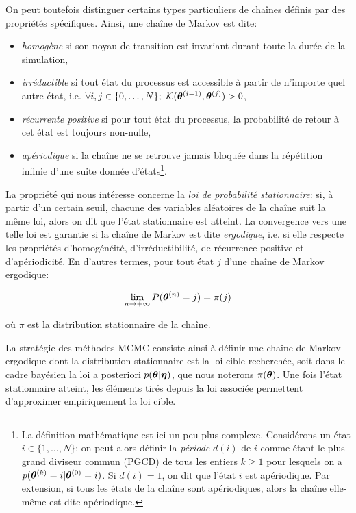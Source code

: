 On peut toutefois distinguer certains types particuliers de chaînes définis par des propriétés spécifiques. Ainsi, une chaîne de Markov est dite:
\begin{itemize}
	\item \textit{homogène} si son noyau de transition est invariant durant toute la durée de la simulation,
	\item \textit{irréductible} si tout état du processus est accessible à partir de n'importe quel autre état, i.e. $\forall i,j \in \{0,\dots,N\}; ~ {\mathcal{K}}({{\bm{\theta}}^{(i-1)}}, {\bm{\theta}}^{(j)}) > 0$,
	\item \textit{récurrente positive} si pour tout état du processus, la probabilité de retour à cet état est toujours non-nulle,
	\item \textit{apériodique} si la chaîne ne se retrouve jamais bloquée dans la répétition infinie d'une suite donnée d'états\footnote{La définition mathématique est ici un peu plus complexe. Considérons un état $i \in \{1, \dots, N\}$: on peut alors définir la \textit{période} $d(i)$ de $i$ comme étant le plus grand diviseur commun (PGCD) de tous les entiers $k \geq 1$ pour lesquels on a $p({\bm{\theta}}^{(k)} = i | {\bm{\theta}}^{(0)} = i)$. Si $d(i) = 1$, on dit que l'état $i$ est apériodique. Par extension, si tous les états de la chaîne sont apériodiques, alors la chaîne elle-même est dite apériodique.}.\\
\end{itemize}

La propriété qui nous intéresse concerne la \textit{loi de probabilité stationnaire}: si, à partir d'un certain seuil, chacune des variables aléatoires de la chaîne suit la même loi, alors on dit que l'état stationnaire est atteint. La convergence vers une telle loi est garantie si la chaîne de Markov est dite \textit{ergodique}, i.e. si elle respecte les propriétés d'homogénéité, d'irréductibilité, de récurrence positive et d'apériodicité. En d'autres termes, pour tout état $j$ d'une chaîne de Markov ergodique:

\begin{equation}
	\lim_{n \rightarrow + \infty} P({\bm{\theta}}^{(n)} = j) = \pi(j)
	\label{eq_definition_loi_stationnaire}
\end{equation}

où $\pi$ est la distribution stationnaire de la chaîne. 


La stratégie des méthodes MCMC consiste ainsi à définir une chaîne de Markov ergodique dont la distribution stationnaire est la loi cible recherchée, soit dans le cadre bayésien la loi a posteriori ${p({\bm{\theta}} | {\bm{\eta}})}$, que nous noterons $\pi({\bm{\theta}})$. Une fois l'état stationnaire atteint, les éléments tirés depuis la loi associée permettent d'approximer {empiriquement} la loi cible.

